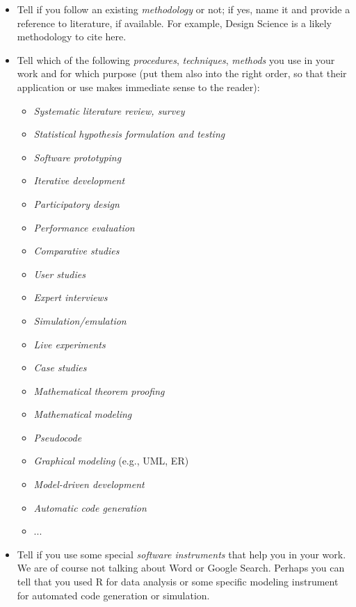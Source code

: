 \begin{itemize}
\item[\Square] Tell if you follow an existing \emph{methodology} or not; if yes, name it and provide a reference to literature, if available. For example, Design Science \cite{von2004design} is a likely methodology to cite here.
\item[\Square] Tell which of the following \emph{procedures}, \emph{techniques}, \emph{methods} you use in your work and for which purpose (put them also into the right order, so that their application or use makes immediate sense to the reader):
\begin{itemize}
\item[\Square] \emph{Systematic literature review, survey}
\item[\Square] \emph{Statistical hypothesis formulation and testing}
\item[\Square] \emph{Software prototyping}
\item[\Square] \emph{Iterative development}
\item[\Square] \emph{Participatory design}
\item[\Square] \emph{Performance evaluation}
\item[\Square] \emph{Comparative studies}
\item[\Square] \emph{User studies}
\item[\Square] \emph{Expert interviews}
\item[\Square] \emph{Simulation/emulation}
\item[\Square] \emph{Live experiments}
\item[\Square] \emph{Case studies}
\item[\Square] \emph{Mathematical theorem proofing}
\item[\Square] \emph{Mathematical modeling}
\item[\Square] \emph{Pseudocode}
\item[\Square] \emph{Graphical modeling} (e.g., UML, ER)
\item[\Square] \emph{Model-driven development}
\item[\Square] \emph{Automatic code generation}
\item[\Square] ...
\end{itemize}

\item[\Square] Tell if you use some special \emph{software instruments} that help you in your work. We are of course not talking about Word or Google Search. Perhaps you can tell that you used R for data analysis or some specific modeling instrument for automated code generation or simulation.
\end{itemize}



